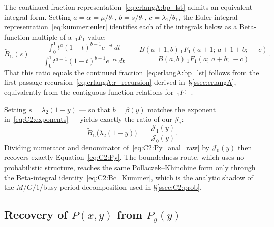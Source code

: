 The continued-fraction representation~\eqref{eq:erlangA:bp_lst} admits an equivalent integral form.  Setting $a=\alpha=\mu/\theta_1$, $b=s/\theta_1$, $c=\lambda_1/\theta_1$, the Euler integral representation~\eqref{eq:kummer:euler} identifies each of the integrals below as a Beta-function multiple of a $\,{}_1F_1$ value:
\begin{equation}
    \widetilde{B}_C(s) \;=\; \frac{\displaystyle\int_{0}^{1} t^{a}(1-t)^{b-1}e^{-ct}\,dt}{\displaystyle\int_{0}^{1} t^{a-1}(1-t)^{b-1}e^{-ct}\,dt}
    \;=\; \frac{B(a+1,b)\,{}_1F_1(a+1;\,a+1+b;\,-c)}{B(a,b)\,{}_1F_1(a;\,a+b;\,-c)}.
    \label{eq:C2:Bc_Kummer}
\end{equation}
That this ratio equals the continued fraction~\eqref{eq:erlangA:bp_lst} follows from the first-passage recursion~\eqref{eq:erlangA:r_recursion} derived in~\S\ref{ssec:erlangA}, equivalently from the contiguous-function relations for $\,{}_1F_1$~\cite{dlmf}.

Setting $s=\lambda_2(1-y)$ — so that $b=\beta(y)$ matches the exponent in~\eqref{eq:C2:exponents} — yields exactly the ratio of our $\mathcal{J}_i$:
\begin{equation}
    \widetilde{B}_C\bigl(\lambda_2(1-y)\bigr) \;=\; \frac{\mathcal{J}_1(y)}{\mathcal{J}_0(y)}.
\end{equation}
Dividing numerator and denominator of~\eqref{eq:C2:Py_anal_raw} by $\mathcal{J}_0(y)$ then recovers exactly Equation~\eqref{eq:C2:Py}. The boundedness route, which uses no probabilistic structure, reaches the same Pollaczek--Khinchine form only through the Beta-integral identity~\eqref{eq:C2:Bc_Kummer}, which is the analytic shadow of the $M/G/1$/busy-period decomposition used in \S\ref{ssec:C2:prob}.

\subsection{Recovery of $P(x,y)$ from $P_y(y)$}\label{ssec:C2:recovery}

